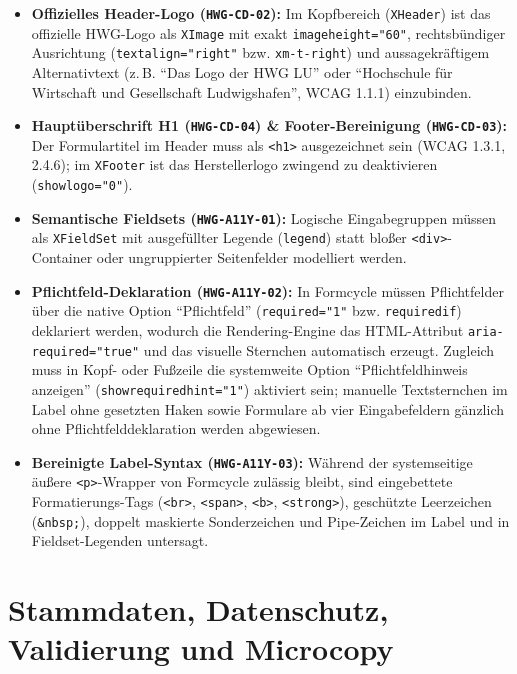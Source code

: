 \begin{itemize}
    \item \textbf{Offizielles Header-Logo (\texttt{HWG-CD-02}):} Im Kopfbereich (\texttt{XHeader}) ist das offizielle HWG-Logo als \texttt{XImage} mit exakt \texttt{imageheight="60"}, rechtsbündiger Ausrichtung (\texttt{textalign="right"} bzw. \texttt{xm-t-right}) und aussagekräftigem Alternativtext (z.\,B. \enquote{Das Logo der HWG LU} oder \enquote{Hochschule für Wirtschaft und Gesellschaft Ludwigshafen}, WCAG 1.1.1) einzubinden.
    \item \textbf{Hauptüberschrift H1 (\texttt{HWG-CD-04}) \& Footer-Bereinigung (\texttt{HWG-CD-03}):} Der Formulartitel im Header muss als \texttt{<h1>} ausgezeichnet sein (WCAG 1.3.1, 2.4.6); im \texttt{XFooter} ist das Herstellerlogo zwingend zu deaktivieren (\texttt{showlogo="0"}).
    \item \textbf{Semantische Fieldsets (\texttt{HWG-A11Y-01}):} Logische Eingabegruppen müssen als \texttt{XFieldSet} mit ausgefüllter Legende (\texttt{legend}) statt bloßer \texttt{<div>}-Container oder ungruppierter Seitenfelder modelliert werden.
    \item \textbf{Pflichtfeld-Deklaration (\texttt{HWG-A11Y-02}):} In Formcycle müssen Pflichtfelder über die native Option \enquote{Pflichtfeld} (\texttt{required="1"} bzw. \texttt{requiredif}) deklariert werden, wodurch die Rendering-Engine das HTML-Attribut \texttt{aria-required="true"} und das visuelle Sternchen automatisch erzeugt. Zugleich muss in Kopf- oder Fußzeile die systemweite Option \enquote{Pflichtfeldhinweis anzeigen} (\texttt{showrequired\allowbreak hint="1"}) aktiviert sein; manuelle Textsternchen im Label ohne gesetzten Haken sowie Formulare ab vier Eingabefeldern gänzlich ohne Pflichtfelddeklaration werden abgewiesen.
    \item \textbf{Bereinigte Label-Syntax (\texttt{HWG-A11Y-03}):} Während der systemseitige äußere \texttt{<p>}-Wrapper von Formcycle zulässig bleibt, sind eingebettete Formatierungs-Tags (\texttt{<br>}, \texttt{<span>}, \texttt{<b>}, \texttt{<strong>}), geschützte Leerzeichen (\texttt{\&nbsp;}), doppelt maskierte Sonderzeichen und Pipe-Zeichen im Label und in Fieldset-Legenden untersagt.
\end{itemize}

\section{Stammdaten, Datenschutz, Validierung und Microcopy}
\label{sec:datenschutz_validierung}

